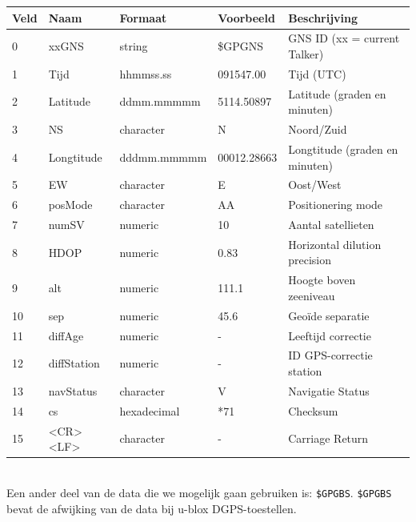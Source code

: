 \begin{tabularx}{\textwidth}{| l | l | l | l | X |}
    \hline
    \textbf{Veld} & \textbf{Naam} & \textbf{Formaat} & \textbf{Voorbeeld} & \textbf{Beschrijving}          \\ \hline
    0             & xxGNS         & string           & \$GPGNS            & GNS ID (xx = current Talker)   \\ \hline
    1             & Tijd          & hhmmss.ss        & 091547.00          & Tijd (UTC)                     \\ \hline
    2             & Latitude      & ddmm.mmmmm       & 5114.50897         & Latitude (graden en minuten)   \\ \hline
    3             & NS            & character        & N                  & Noord/Zuid                     \\ \hline
    4             & Longtitude    & dddmm.mmmmm      & 00012.28663        & Longtitude (graden en minuten) \\ \hline
    5             & EW            & character        & E                  & Oost/West                      \\ \hline
    6             & posMode       & character        & AA                 & Positionering mode             \\ \hline
    7             & numSV         & numeric          & 10                 & Aantal satellieten             \\ \hline
    8             & HDOP          & numeric          & 0.83               & Horizontal dilution precision  \\ \hline
    9             & alt           & numeric          & 111.1              & Hoogte boven zeeniveau         \\ \hline
    10            & sep           & numeric          & 45.6               & Geoïde separatie               \\ \hline
    11            & diffAge       & numeric          & -                  & Leeftijd correctie             \\ \hline
    12            & diffStation   & numeric          & -                  & ID GPS-correctie station       \\ \hline
    13            & navStatus     & character        & V                  & Navigatie Status               \\ \hline
    14            & cs            & hexadecimal      & *71                & Checksum                       \\ \hline
    15            & <CR><LF>      & character        & -                  & Carriage Return                \\ \hline
\end{tabularx}
\citep[p. 116]{UBlox8}\\
Een ander deel van de data die we mogelijk gaan gebruiken is:
\texttt{\$GPGBS}. \texttt{\$GPGBS} bevat de afwijking van de data bij u-blox
DGPS-toestellen.
\citep[p. 111]{UBlox8}

